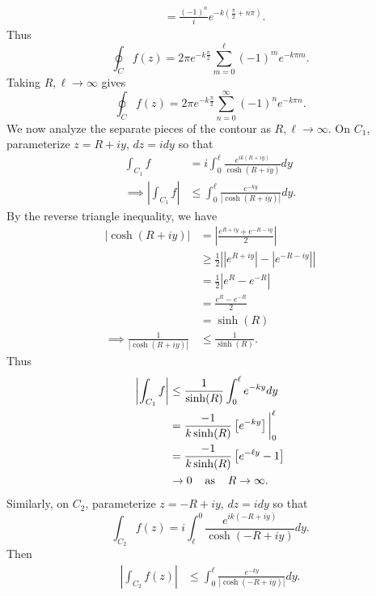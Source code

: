 \documentclass{article}
\begin{document}
\begin{itemize}
\begin{itemize}
\begin{align*}
            &= \frac{(-1)^n}{i}e^{-k\left(\frac{\pi}{2}+n\pi\right)}.
        \end{align*}
        Thus
        \[\oint_C f(z) = 2\pi e^{-k\frac{\pi}{2}}\sum_{m = 0}^{\ell}(-1)^me^{-k\pi m}.\]
        Taking $R, \ell \to \infty$ gives 
        \[\oint_C f(z) = 2\pi e^{-k\frac{\pi}{2}}\sum_{n = 0}^{\infty} (-1)^ne^{-k\pi n}.\]
        We now analyze the separate pieces of the contour as $R, \ell \to \infty$. On $C_1$, parameterize $z = R + iy$, $dz = idy$ so that
        \begin{align*}
            \int_{C_1}f &= i\int_0^{\ell} \frac{e^{ik(R + iy)}}{\cosh(R + iy)}dy\\
            \implies \left|\int_{C_1}f\right| &\leq \int_0^{\ell} \frac{e^{-ky}}{|\cosh(R + iy)|}dy.
        \end{align*}
        By the reverse triangle inequality, we have
        \begin{align*}
            |\cosh(R + iy)| &= \left|\frac{e^{R + iy} + e^{-R - iy}}{2}\right|\\
            &\geq \frac{1}{2}\left||e^{R + iy}| - |e^{-R - iy}|\right|\\
            &= \frac{1}{2}\left|e^{R} - e^{-R}\right|\\
            &= \frac{e^R - e^{-R}}{2}\\
            &= \sinh(R)\\
            \implies \frac{1}{|\cosh(R + iy)|} &\leq \frac{1}{\sinh(R)}.
        \end{align*}
        Thus
        \begin{align*}
            \left|\int_{C_1}f\right| &\leq \frac{1}{\sinh(R)}\int_0^{\ell}e^{-ky}dy\\
            &= \frac{-1}{k\sinh(R)}\left[e^{-ky}\right]\bigg|_0^{\ell}\\
            &= \frac{-1}{k\sinh(R)}\left[e^{-\ell y} - 1\right]\\
            &\to 0 \hspace{0.4cm} \text{as} \hspace{0.4cm} R \to \infty.
        \end{align*}
        Similarly, on $C_2$, parameterize $z = -R + iy$, $dz = idy$ so that 
        \[\int_{C_2}f(z) = i\int_{\ell}^0 \frac{e^{ik(-R + iy)}}{\cosh(-R + iy)}dy.\]
        Then
        \begin{align*}
            \left|\int_{C_2}f(z)\right| &\leq\int_0^{\ell} \frac{e^{-ky}}{|\cosh(-R + iy)|}dy.
        \end{align*}

\end{itemize}
\end{itemize}
\end{document}
